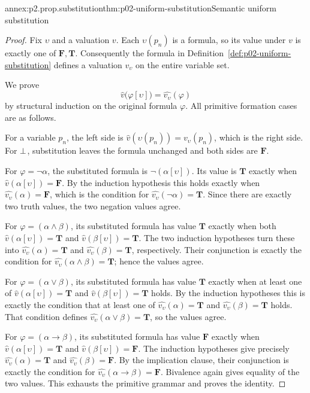 \begin{annexitem}{annex:p2.prop.substitution}{thm:p02-uniform-substitution}{Semantic uniform substitution}
\begin{proof}
Fix \(\upsilon\) and a valuation \(v\).  Each \(\upsilon(p_n)\) is a formula,
so its value under \(v\) is exactly one of \(\mathbf F,\mathbf T\).
Consequently the formula in
Definition~\ref{def:p02-uniform-substitution} defines a valuation
\(v_\upsilon\) on the entire variable set.

We prove
\[
 \widehat v\bigl(\varphi[\upsilon]\bigr)
    =\widehat{v_\upsilon}(\varphi)
\]
by structural induction on the original formula \(\varphi\).
All primitive formation cases are as follows.

For a variable \(p_n\), the left side is
\(\widehat v(\upsilon(p_n))=v_\upsilon(p_n)\), which is the right side.
For \(\bot\), substitution leaves the formula unchanged and both sides
are \(\mathbf F\).

For \(\varphi=\neg\alpha\), the substituted formula is
\(\neg(\alpha[\upsilon])\).  Its value is \(\mathbf T\) exactly when
\(\widehat v(\alpha[\upsilon])=\mathbf F\).
By the induction hypothesis this holds exactly when
\(\widehat{v_\upsilon}(\alpha)=\mathbf F\), which is the condition for
\(\widehat{v_\upsilon}(\neg\alpha)=\mathbf T\).
Since there are exactly two truth values, the two negation values agree.

For \(\varphi=(\alpha\land\beta)\), its substituted formula has value
\(\mathbf T\) exactly when both
\(\widehat v(\alpha[\upsilon])=\mathbf T\) and
\(\widehat v(\beta[\upsilon])=\mathbf T\).
The two induction hypotheses turn these into
\(\widehat{v_\upsilon}(\alpha)=\mathbf T\) and
\(\widehat{v_\upsilon}(\beta)=\mathbf T\), respectively.
Their conjunction is exactly the condition for
\(\widehat{v_\upsilon}(\alpha\land\beta)=\mathbf T\); hence the values agree.

For \(\varphi=(\alpha\lor\beta)\), its substituted formula has value
\(\mathbf T\) exactly when at least one of
\(\widehat v(\alpha[\upsilon])=\mathbf T\) and
\(\widehat v(\beta[\upsilon])=\mathbf T\) holds.
By the induction hypotheses this is exactly the condition that at least one of
\(\widehat{v_\upsilon}(\alpha)=\mathbf T\) and
\(\widehat{v_\upsilon}(\beta)=\mathbf T\) holds.
That condition defines
\(\widehat{v_\upsilon}(\alpha\lor\beta)=\mathbf T\), so the values agree.

For \(\varphi=(\alpha\to\beta)\), its substituted formula has value
\(\mathbf F\) exactly when
\(\widehat v(\alpha[\upsilon])=\mathbf T\) and
\(\widehat v(\beta[\upsilon])=\mathbf F\).
The induction hypotheses give precisely
\(\widehat{v_\upsilon}(\alpha)=\mathbf T\) and
\(\widehat{v_\upsilon}(\beta)=\mathbf F\).
By the implication clause, their conjunction is exactly the condition for
\(\widehat{v_\upsilon}(\alpha\to\beta)=\mathbf F\).
Bivalence again gives equality of the two values.  This exhausts the primitive
grammar and proves the identity.


\end{proof}
\end{annexitem}
